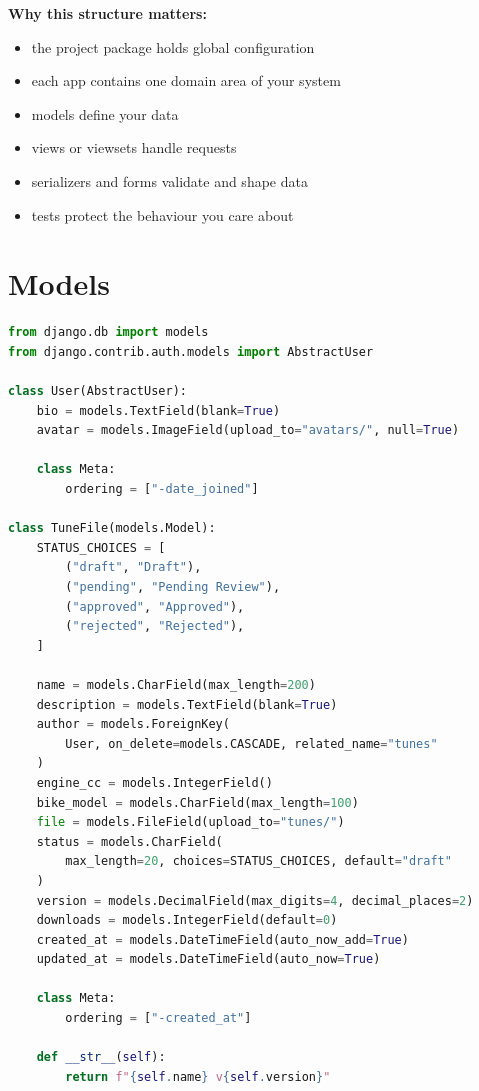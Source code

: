 \documentclass[12pt, a4paper, oneside]{book}
\begin{document}
\textbf{Why this structure matters:}
\begin{itemize}[leftmargin=2em]
    \item the project package holds global configuration
    \item each app contains one domain area of your system
    \item models define your data
    \item views or viewsets handle requests
    \item serializers and forms validate and shape data
    \item tests protect the behaviour you care about
\end{itemize}

\section{Models}

\begin{lstlisting}[language=Python, caption={Django models}]
from django.db import models
from django.contrib.auth.models import AbstractUser

class User(AbstractUser):
    bio = models.TextField(blank=True)
    avatar = models.ImageField(upload_to="avatars/", null=True)

    class Meta:
        ordering = ["-date_joined"]

class TuneFile(models.Model):
    STATUS_CHOICES = [
        ("draft", "Draft"),
        ("pending", "Pending Review"),
        ("approved", "Approved"),
        ("rejected", "Rejected"),
    ]

    name = models.CharField(max_length=200)
    description = models.TextField(blank=True)
    author = models.ForeignKey(
        User, on_delete=models.CASCADE, related_name="tunes"
    )
    engine_cc = models.IntegerField()
    bike_model = models.CharField(max_length=100)
    file = models.FileField(upload_to="tunes/")
    status = models.CharField(
        max_length=20, choices=STATUS_CHOICES, default="draft"
    )
    version = models.DecimalField(max_digits=4, decimal_places=2)
    downloads = models.IntegerField(default=0)
    created_at = models.DateTimeField(auto_now_add=True)
    updated_at = models.DateTimeField(auto_now=True)

    class Meta:
        ordering = ["-created_at"]

    def __str__(self):
        return f"{self.name} v{self.version}"
\end{lstlisting}
\end{document}
